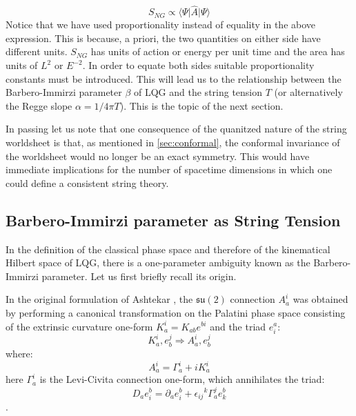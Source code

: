 \documentclass{ws-mpla}
\newcommand{\mf}[1]{\mathfrak{#1}}
\newcommand{\expect}[1]{\langle #1\rangle}
\begin{document}
\begin{equation}\label{eqn:emergent-action}
	S_{NG} \propto \expect{\Psi\vert \hat A \vert \Psi}
\end{equation}
Notice that we have used proportionality instead of equality in the above expression. This is because, a priori, the two quantities on either side have different units. $ S_{NG} $ has units of action or energy per unit time and the area has units of $ L^2 $ or $ E^{-2} $. In order to equate both sides suitable proportionality constants must be introduced. This will lead us to the relationship between the Barbero-Immirzi parameter $ \beta $ of LQG \cite{Barbero1996From,Immirzi1996Real} and the string tension $ T $ (or alternatively the Regge slope $ \alpha = 1/4\pi T$). This is the topic of the next section.

In passing let us note that one consequence of the quanitzed nature of the string worldsheet is that, as mentioned in \autoref{sec:conformal}, the conformal invariance of the worldsheet would no longer be an exact symmetry. This would have immediate implications for the number of spacetime dimensions in which one could define a consistent string theory.

\subsection{Barbero-Immirzi parameter as String Tension}

In the definition of the classical phase space and therefore of the kinematical Hilbert space of LQG, there is a one-parameter ambiguity \cite{Barbero1996From,Immirzi1996Real} known as the Barbero-Immirzi parameter. Let us first briefly recall its origin.

In the original formulation of Ashtekar \cite{Ashtekar1986New,Ashtekar1987New}, the $ \mf{su}(2) $ connection $ A_a^i $ was obtained by performing a canonical transformation on the Palatini phase space consisting of the extrinsic curvature one-form $ K^i_a = K_{ab} e^{bi} $ and the triad $ e^a_i $:
\begin{equation}\label{eqn:phase-space}
	K^i_a, e^j_b \Rightarrow A^i_a, e^j_b
\end{equation}
where:
\begin{equation}\label{eqn:ashtekar-transform}
	A^i_a = \Gamma^i_a + i K^i_a
\end{equation}
here $ \Gamma^i_a $ is the Levi-Civita connection one-form, which annihilates the triad:
$$ D_a e^b_i = \partial_a e^b_i + \epsilon_{ij}{}^k \Gamma^j_a e^b_k $$.
\end{document}
